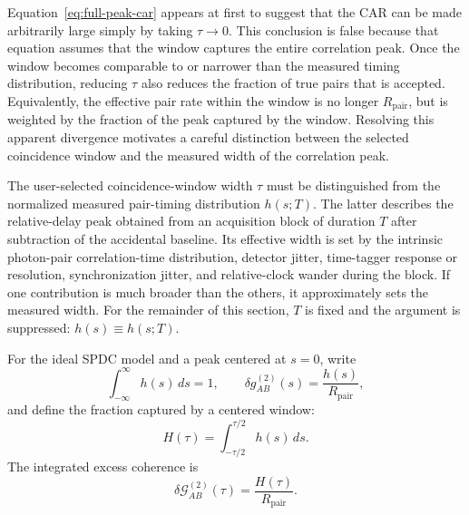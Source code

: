 \documentclass[a4paper,10pt]{article}
\begin{document}
Equation~\eqref{eq:full-peak-car} appears at first to suggest that the CAR can
be made arbitrarily large simply by taking $\tau\to0$.  This conclusion is
false because that equation assumes that the window captures the entire
correlation peak.  Once the window becomes comparable to or narrower than the
measured timing distribution, reducing $\tau$ also reduces the fraction of
true pairs that is accepted.  Equivalently, the effective pair rate within the
window is no longer $R_{\mathrm{pair}}$, but is weighted by the fraction of the
peak captured by the window.  Resolving this apparent divergence motivates a
careful distinction between the selected coincidence window and the measured
width of the correlation peak.

The user-selected coincidence-window width $\tau$ must be distinguished from the normalized measured pair-timing distribution $h(s;T)$.  The latter describes the relative-delay peak obtained from an acquisition block of duration $T$ after subtraction of the accidental baseline.  Its effective width is set by the intrinsic photon-pair correlation-time distribution, detector jitter, time-tagger response or resolution, synchronization jitter, and relative-clock wander during the block.  If one contribution is much broader than the others, it approximately sets the measured width.  For the remainder of this section, $T$ is fixed and the argument is suppressed: $h(s)\equiv h(s;T)$.

For the ideal SPDC model and a peak centered at $s=0$, write
\begin{equation}
    \int_{-\infty}^{\infty}h(s)\,ds=1,
    \qquad
    \delta g^{(2)}_{AB}(s)=\frac{h(s)}{R_{\mathrm{pair}}},
\end{equation}
and define the fraction captured by a centered window:
\begin{equation}
    \label{eq:captured-fraction}
    H(\tau)=\int_{-\tau/2}^{\tau/2}h(s)\,ds.
\end{equation}
The integrated excess coherence is
\begin{equation}
    \label{eq:window-integrated-excess}
    \delta\mathcal{G}^{(2)}_{AB}(\tau)
    =\frac{H(\tau)}{R_{\mathrm{pair}}}.
\end{equation}
\end{document}
